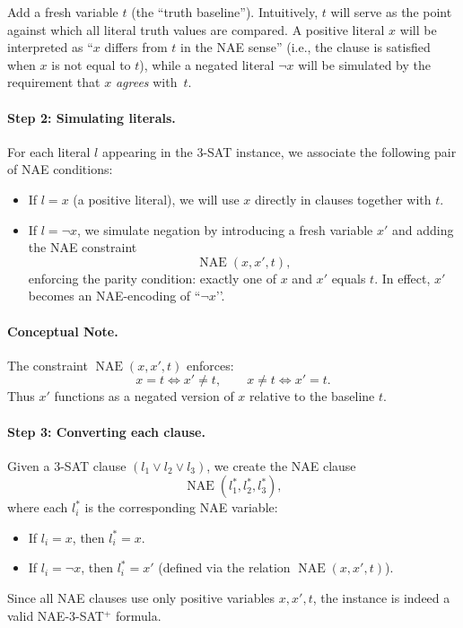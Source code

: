 \documentclass[9pt]{extarticle}
\begin{document}
Add a fresh variable $t$ (the ``truth baseline'').  Intuitively, $t$ will serve
as the point against which all literal truth values are compared.  A positive
literal $x$ will be interpreted as ``$x$ differs from $t$ in the NAE sense''
(i.e., the clause is satisfied when $x$ is not equal to $t$), while a negated
literal $\neg x$ will be simulated by the requirement that $x$ \emph{agrees}
with~$t$.

\paragraph{Step 2: Simulating literals.}

For each literal $l$ appearing in the 3-SAT instance, we associate the following
pair of NAE conditions:
\begin{itemize}
    \item If $l = x$ (a positive literal), we will use $x$ directly in clauses
    together with $t$.
    \item If $l = \neg x$, we simulate negation by introducing a fresh variable
    $x'$ and adding the NAE constraint
    \[
    \operatorname{NAE}(x, x', t),
    \]
    enforcing the parity condition: exactly one of $x$ and $x'$ equals $t$.  
    In effect, $x'$ becomes an NAE-encoding of ``$\neg x$’’.
\end{itemize}

\paragraph{Conceptual Note.}
The constraint $\operatorname{NAE}(x,x',t)$ enforces:
\[
x = t \iff x' \neq t, \qquad
x \neq t \iff x' = t.
\]
Thus $x'$ functions as a negated version of $x$ relative to the baseline $t$.

\paragraph{Step 3: Converting each clause.}

Given a 3-SAT clause $(l_1 \lor l_2 \lor l_3)$, we create the NAE clause
\[
\operatorname{NAE}(l_1^*, l_2^*, l_3^*),
\]
where each $l_i^*$ is the corresponding NAE variable:
\begin{itemize}
    \item If $l_i = x$, then $l_i^* = x$.
    \item If $l_i = \neg x$, then $l_i^* = x'$ (defined via the relation
    $\operatorname{NAE}(x,x',t)$).
\end{itemize}
Since all NAE clauses use only positive variables $x, x', t$, the instance is
indeed a valid \textsc{NAE-3-SAT}$^+$ formula.
\end{document}
